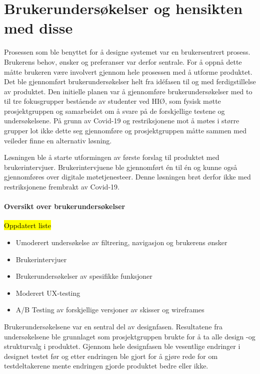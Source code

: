 \section{Brukerundersøkelser og hensikten med disse}
Prosessen som ble benyttet for å designe systemet var en brukersentrert prosess. Brukerens behov, ønsker og preferanser var derfor sentrale. For å oppnå dette måtte brukeren være involvert gjennom hele prosessen med å utforme produktet. Det ble gjennomført brukerundersøkelser helt fra idéfasen til og med ferdigstillelse av produktet.
Den initielle planen var å gjennomføre brukerundersøkelser med to til tre fokusgrupper bestående av studenter ved HIØ, som fysisk møtte prosjektgruppen og samarbeidet om å svare på de forskjellige testene og undersøkelsene. På grunn av Covid-19 og restriksjonene mot å møtes i større grupper lot ikke dette seg gjennomføre og prosjektgruppen måtte sammen med veileder finne en alternativ løsning.

Løsningen ble å starte utformingen av første forslag til produktet med brukerintervjuer. Brukerintervjuene ble gjennomført én til én og kunne også gjennomføres over digitale møtetjenesteer. Denne løsningen brøt derfor ikke med restriksjonene frembrakt av Covid-19.

\paragraph{Oversikt over brukerundersøkelser}
\hl{Oppdatert liste}
\begin{itemize}
\item Umoderert undersøkelse av filtrering, navigasjon og brukerens ønsker
\item Brukerintervjuer
\item Brukerundersøkelser av spesifikke funksjoner
\item Moderert UX-testing
\item A/B Testing av forskjellige versjoner av skisser og wireframes
\end{itemize}

\newline
Brukerundersøkelsene var en sentral del av designfasen. Resultatene fra undersøkelsene ble grunnlaget som prosjektgruppen brukte for å ta alle design -og strukturvalg i produktet. Gjennom hele designfasen ble vesentlige endringer i designet testet før og etter endringen ble gjort for å gjøre rede for om testdeltakerene mente endringen gjorde produktet bedre eller ikke.

